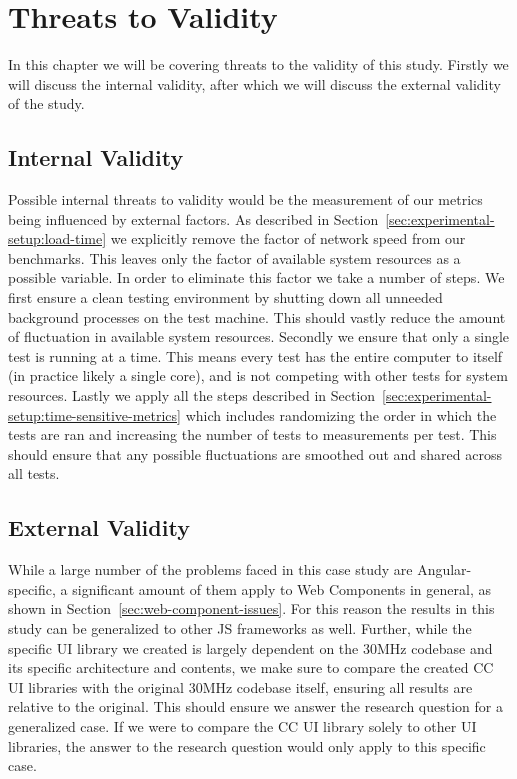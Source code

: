 \chapter{Threats to Validity}

In this chapter we will be covering threats to the validity of this study. Firstly we will discuss the internal validity, after which we will discuss the external validity of the study.

\section{Internal Validity}
Possible internal threats to validity would be the measurement of our metrics being influenced by external factors. As described in Section~\ref{sec:experimental-setup:load-time} we explicitly remove the factor of network speed from our benchmarks. This leaves only the factor of available system resources as a possible variable. In order to eliminate this factor we take a number of steps. We first ensure a clean testing environment by shutting down all unneeded background processes on the test machine. This should vastly reduce the amount of fluctuation in available system resources. Secondly we ensure that only a single test is running at a time. This means every test has the entire computer to itself (in practice likely a single core), and is not competing with other tests for system resources. Lastly we apply all the steps described in Section~\ref{sec:experimental-setup:time-sensitive-metrics} which includes randomizing the order in which the tests are ran and increasing the number of tests to \numMeasures{} measurements per test. This should ensure that any possible fluctuations are smoothed out and shared across all tests.

\section{External Validity}
While a large number of the problems faced in this case study are Angular-specific, a significant amount of them apply to Web Components in general, as shown in Section~\ref{sec:web-component-issues}. For this reason the results in this study can be generalized to other JS frameworks as well. Further, while the specific UI library we created is largely dependent on the 30MHz codebase and its specific architecture and contents, we make sure to compare the created CC UI libraries with the original 30MHz codebase itself, ensuring all results are relative to the original. This should ensure we answer the research question for a generalized case. If we were to compare the CC UI library solely to other UI libraries, the answer to the research question would only apply to this specific case.